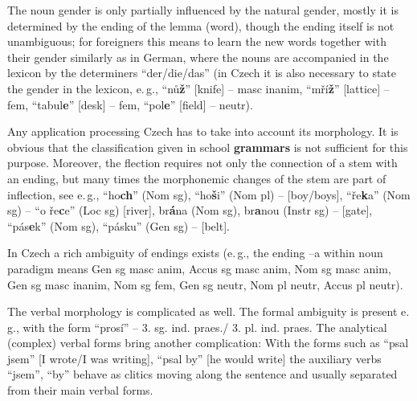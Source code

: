 \begin{multicols}{2}
The noun gender is only partially influenced by the natural gender, mostly it is determined by the ending of the lemma (word), though the ending itself  is not unambiguous; for foreigners this means to learn the new words together with their gender similarly as in German, where the nouns are accompanied in the lexicon by the determiners “der/die/das”  (in Czech it is also necessary to state the gender in the lexicon, e.\,g., “nů\textbf{ž}” {[}knife{]} – masc inanim, “mří\textbf{ž}”  {[}lattice{]} --  fem, “tabul\textbf{e}” {[}desk{]} – fem, “pol\textbf{e}” {[}field{]} – neutr).

Any application processing Czech has to take into account its morphology. It is obvious that the classification given in school \textbf{grammars} is not sufficient for this purpose. Moreover, the flection requires not only the connection of a stem with an ending, but many times the morphonemic changes of the stem are part of inflection, see e.\,g., “ho\textbf{ch}” (Nom sg), “ho\textbf{š}i” (Nom pl) – {[}boy/boys{]}, “ře\textbf{k}a” (Nom sg) – “o ře\textbf{c}e” (Loc sg) {[}river{]}, br\textbf{á}na (Nom sg), br\textbf{a}nou (Instr sg) – {[}gate{]}, “pás\textbf{e}k” (Nom sg), “pásku” (Gen sg) – {[}belt{]}.

In Czech a rich ambiguity of endings exists (e.\,g., the ending –a within noun paradigm means Gen sg masc anim, Accus sg masc anim, Nom sg masc anim, Gen sg masc inanim, Nom sg fem, Gen sg neutr, Nom pl neutr, Accus pl neutr).

The verbal morphology is complicated as well. The formal ambiguity is present e.\,g., with the form “prosí” – 3. sg. ind. praes./ 3. pl. ind. praes. The analytical (complex) verbal forms bring another complication: With the forms such as “psal jsem” {[}I wrote/I was writing{]}, “psal by” {[}he would write{]} the auxiliary verbs “jsem”, “by”  behave as clitics moving along the sentence and usually separated from their main verbal forms.


\end{multicols}
